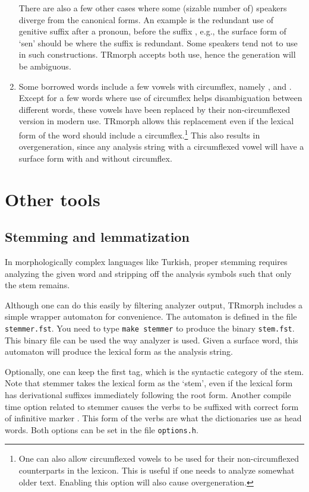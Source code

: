 \documentclass[twocolumn]{article}
\begin{document}
\begin{enumerate}
There are also a few other cases where some (sizable number of)
speakers diverge from the canonical forms. An example is the redundant
use of genitive suffix after a pronoun, before the suffix
, e.g., the surface form of
`sen' should be  where the
suffix  is redundant. Some speakers tend not to use 
in such constructions. TRmorph accepts both use, hence the generation
will be ambiguous.

\item Some borrowed words include a few vowels with circumflex, namely
,
 and
. Except for a few words where use of circumflex helps
disambiguation between different words, these vowels have been replaced by their
non-circumflexed version in modern use. TRmorph allows this
replacement even if the lexical form of the word should include a
circumflex.\footnote{One can also allow circumflexed vowels
to be used for their non-circumflexed counterparts in the lexicon. This is useful if one needs to
analyze somewhat older text. Enabling this option will also cause
overgeneration.} This also results in overgeneration, since any
analysis string with a circumflexed vowel will have a surface form
with and without circumflex.

\end{enumerate}


\section{\label{sec:other-tools}Other tools}

\subsection{Stemming and lemmatization}

In morphologically complex languages like Turkish, proper stemming
requires analyzing the given word and stripping off the analysis
symbols such that only the stem remains.

Although one can do this easily by filtering analyzer output, TRmorph
includes a simple wrapper automaton for convenience. The
automaton is defined in the file \lstinline{stemmer.fst}. You need to
type \lstinline{make stemmer} to produce the binary
\lstinline{stem.fst}. This binary file can be used the way analyzer is
used. Given a surface word, this automaton will produce the lexical
form as the analysis string.

Optionally, one can keep the first tag, which is the syntactic
category of the stem. Note that stemmer takes the lexical form as the
`stem', even if the lexical form has derivational suffixes immediately
following the root form.
Another compile time option related to stemmer causes the verbs to be
suffixed with correct form of infinitive marker . This form
of the verbs are what the dictionaries use as head words. Both options
can be set in the file \lstinline{options.h}.
\end{document}

